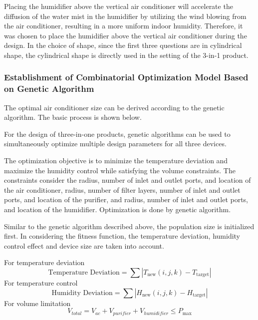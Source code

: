 \documentclass{apmcmthesis}
\begin{document}
Placing the humidifier above the vertical air conditioner will accelerate the diffusion of the water mist in the humidifier by utilizing the wind blowing from the air conditioner, resulting in a more uniform indoor humidity. Therefore, it was chosen to place the humidifier above the vertical air conditioner during the design.
In the choice of shape, since the first three questions are in cylindrical shape, the cylindrical shape is directly used in the setting of the 3-in-1 product.


\subsubsection{Establishment of Combinatorial Optimization Model Based on Genetic Algorithm}
The optimal air conditioner size can be derived according to the genetic algorithm. The basic process is shown below.

For the design of three-in-one products, genetic algorithms can be used to simultaneously optimize multiple design parameters for all three devices.

The optimization objective is to minimize the temperature deviation and maximize the humidity control while satisfying the volume constraints. The constraints consider the radius, number of inlet and outlet ports, and location of the air conditioner, radius, number of filter layers, number of inlet and outlet ports, and location of the purifier, and radius, number of inlet and outlet ports, and location of the humidifier. Optimization is done by genetic algorithm.

Similar to the genetic algorithm described above, the population size is initialized first. In considering the fitness function, the temperature deviation, humidity control effect and device size are taken into account.

For temperature deviation
\begin{equation}
	\text{Temperature Deviation} = \sum \left| T_{\text{new}}(i, j, k) - T_{\text{target}} \right|
\end{equation}
For temperature control
\begin{equation}
	\text{Humidity Deviation} = \sum \left| H_{\text{new}}(i, j, k) - H_{\text{target}} \right|
\end{equation}
For volume limitation
\begin{equation}
	{{V}_{total}}={{V}_{ac}}+{{V}_{purifier}}+{{V}_{humidifier}}\le {{P}_{\max }}
\end{equation}
\end{document}
